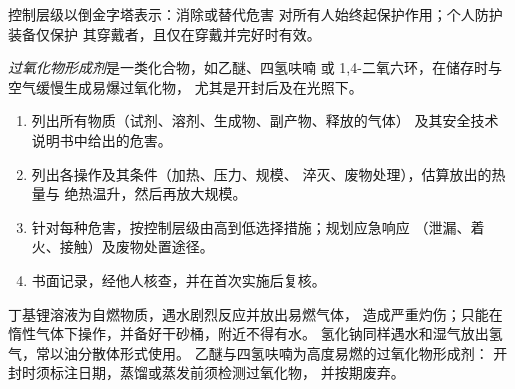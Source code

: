 \begin{omfigure}

{\small 控制层级以倒金字塔表示：消除或替代危害
对所有人始终起保护作用；个人防护装备仅保护
其穿戴者，且仅在穿戴并完好时有效。}
\end{omfigure}

\begin{definition}[过氧化物形成剂]\label{def:b3:lab-techniques-3:peroxide}
\emph{过氧化物形成剂}是一类化合物，如乙醚、四氢呋喃
或 1,4-二氧六环，在储存时与空气缓慢生成易爆过氧化物，
尤其是开封后及在光照下。
\end{definition}

\begin{method}[评估新实验步骤的风险]\label{met:b3:lab-techniques-3:risk-assessment}
\begin{enumerate}
  \item 列出所有物质（试剂、溶剂、生成物、副产物、释放的气体）
        及其安全技术说明书中给出的危害。
  \item 列出各操作及其条件（加热、压力、规模、
        淬灭、废物处理），估算放出的热量与
        绝热温升，然后再放大规模。
  \item 针对每种危害，按控制层级由高到低选择措施；规划应急响应
        （泄漏、着火、接触）及废物处置途径。
  \item 书面记录，经他人核查，并在首次实施后复核。
\end{enumerate}
\end{method}

\begin{safety}{}
丁基锂溶液为自燃物质，遇水剧烈反应并放出易燃气体，
造成严重灼伤；只能在惰性气体下操作，并备好干砂桶，附近不得有水。
氢化钠同样遇水和湿气放出氢气，常以油分散体形式使用。
乙醚与四氢呋喃为高度易燃的过氧化物形成剂：
开封时须标注日期，蒸馏或蒸发前须检测过氧化物，
并按期废弃。
\end{safety}

